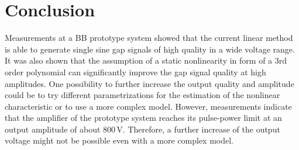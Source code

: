 \documentclass[a4paper,
              ]{jacow}
\begin{document}
	
	\section{Conclusion}
	Measurements at a BB prototype system showed that the current linear method is able to generate single sine gap signals of high quality in a wide voltage range. %
	It was also shown that the assumption of a static nonlinearity in form of a 3rd order polynomial can significantly improve the gap signal quality at high amplitudes. 
	One possibility to further increase the output quality and amplitude could be to try different parametrizations for the estimation of the nonlinear characteristic or to
	use a more complex model. However, measurements indicate that the amplifier of the prototype system reaches its pulse-power limit at an output amplitude
	of about 800\,V. Therefore, a further increase of the output voltage might not be possible even with a more complex model.

\newpage

\iffalse  %
	\newpage
	\printbibliography

\else
\end{document}
